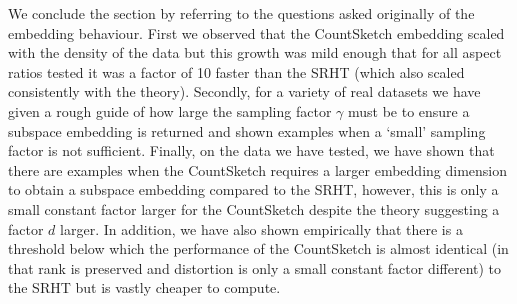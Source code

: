  We conclude the section by referring to the questions asked originally of the
 embedding behaviour.
 First we observed that the CountSketch embedding scaled with the density of the
 data but this growth was mild enough that for all aspect ratios tested it was
 a factor of 10 faster than the SRHT (which also scaled consistently with the
 theory).
 Secondly, for a variety of real datasets we have given a rough guide of how
 large the sampling factor $\gamma$ must be to ensure a subspace embedding is
 returned and shown examples when a `small' sampling factor is not sufficient.
 Finally, on the data we have tested, we have shown that there are examples
 when the CountSketch requires a larger embedding dimension to obtain a subspace
 embedding compared to the SRHT, however, this is only a small constant factor
 larger for the CountSketch despite the theory suggesting a factor $d$ larger.
 In addition, we have also shown empirically that there is a threshold below
 which the performance of the CountSketch is almost identical (in that rank is
 preserved and distortion is only a small constant factor different) to the SRHT
 but is vastly cheaper to compute.



